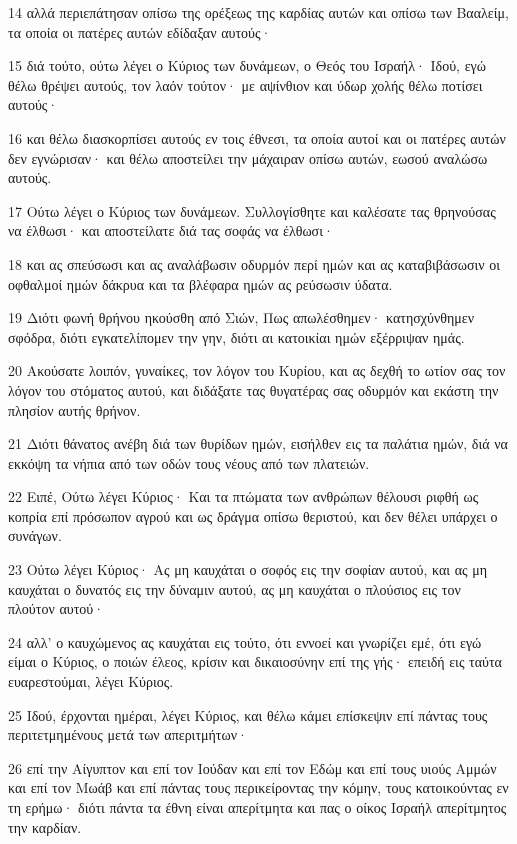 \par 14 αλλά περιεπάτησαν οπίσω της ορέξεως της καρδίας αυτών και οπίσω των Βααλείμ, τα οποία οι πατέρες αυτών εδίδαξαν αυτούς·
\par 15 διά τούτο, ούτω λέγει ο Κύριος των δυνάμεων, ο Θεός του Ισραήλ· Ιδού, εγώ θέλω θρέψει αυτούς, τον λαόν τούτον· με αψίνθιον και ύδωρ χολής θέλω ποτίσει αυτούς·
\par 16 και θέλω διασκορπίσει αυτούς εν τοις έθνεσι, τα οποία αυτοί και οι πατέρες αυτών δεν εγνώρισαν· και θέλω αποστείλει την μάχαιραν οπίσω αυτών, εωσού αναλώσω αυτούς.
\par 17 Ούτω λέγει ο Κύριος των δυνάμεων. Συλλογίσθητε και καλέσατε τας θρηνούσας να έλθωσι· και αποστείλατε διά τας σοφάς να έλθωσι·
\par 18 και ας σπεύσωσι και ας αναλάβωσιν οδυρμόν περί ημών και ας καταβιβάσωσιν οι οφθαλμοί ημών δάκρυα και τα βλέφαρα ημών ας ρεύσωσιν ύδατα.
\par 19 Διότι φωνή θρήνου ηκούσθη από Σιών, Πως απωλέσθημεν· κατησχύνθημεν σφόδρα, διότι εγκατελίπομεν την γην, διότι αι κατοικίαι ημών εξέρριψαν ημάς.
\par 20 Ακούσατε λοιπόν, γυναίκες, τον λόγον του Κυρίου, και ας δεχθή το ωτίον σας τον λόγον του στόματος αυτού, και διδάξατε τας θυγατέρας σας οδυρμόν και εκάστη την πλησίον αυτής θρήνον.
\par 21 Διότι θάνατος ανέβη διά των θυρίδων ημών, εισήλθεν εις τα παλάτια ημών, διά να εκκόψη τα νήπια από των οδών τους νέους από των πλατειών.
\par 22 Ειπέ, Ούτω λέγει Κύριος· Και τα πτώματα των ανθρώπων θέλουσι ριφθή ως κοπρία επί πρόσωπον αγρού και ως δράγμα οπίσω θεριστού, και δεν θέλει υπάρχει ο συνάγων.
\par 23 Ούτω λέγει Κύριος· Ας μη καυχάται ο σοφός εις την σοφίαν αυτού, και ας μη καυχάται ο δυνατός εις την δύναμιν αυτού, ας μη καυχάται ο πλούσιος εις τον πλούτον αυτού·
\par 24 αλλ' ο καυχώμενος ας καυχάται εις τούτο, ότι εννοεί και γνωρίζει εμέ, ότι εγώ είμαι ο Κύριος, ο ποιών έλεος, κρίσιν και δικαιοσύνην επί της γής· επειδή εις ταύτα ευαρεστούμαι, λέγει Κύριος.
\par 25 Ιδού, έρχονται ημέραι, λέγει Κύριος, και θέλω κάμει επίσκεψιν επί πάντας τους περιτετμημένους μετά των απεριτμήτων·
\par 26 επί την Αίγυπτον και επί τον Ιούδαν και επί τον Εδώμ και επί τους υιούς Αμμών και επί τον Μωάβ και επί πάντας τους περικείροντας την κόμην, τους κατοικούντας εν τη ερήμω· διότι πάντα τα έθνη είναι απερίτμητα και πας ο οίκος Ισραήλ απερίτμητος την καρδίαν.

